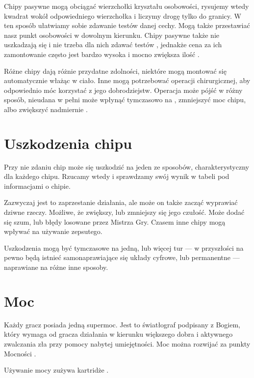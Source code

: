 Chipy pasywne mogą obciągać wierzchołki kryształu osobowości, rysujemy wtedy kwadrat wokół odpowiedniego wierzchołka i liczymy drogę tylko do granicy.
W ten sposób ułatwiamy sobie zdawanie testów danej cechy.
Mogą także przestawiać nasz punkt osobowości w dowolnym kierunku.
Chipy pasywne także nie uszkadzają się i nie trzeba dla nich zdawać testów \abnkp{}, jednakże cena za ich zamontowanie często jest bardzo wysoka i mocno zwiększa ilość \abnkp{}.

Różne chipy dają różnie przydatne zdolności, niektóre mogą montować się automatycznie włażąc w ciało.
Inne mogą potrzebować operacji chirurgicznej, aby odpowiednio móc korzystać z jego dobrodziejstw.
Operacja może pójść w różny sposób, nieudana w pełni może wpłynąć tymczasowo na \abzyc{}, zmniejszyć moc chipu, albo zwiększyć nadmiernie \abnkp{}.

\section{Uszkodzenia chipu}
Przy nie zdaniu \abnkp{} chip może się uszkodzić na jeden ze sposobów, charakterystyczny dla każdego chipu.
Rzucamy wtedy \dx{} i sprawdzamy swój wynik w tabeli pod informacjami o chipie.

Zazwyczaj jest to zaprzestanie działania, ale może on także zacząć wyprawiać dziwne rzeczy.
Możliwe, że zwiększy, lub zmniejszy się jego czułość.
Może dodać się szum, lub błędy losowane przez Mistrza Gry.
Czasem inne chipy mogą wpływać na używanie zepsutego.

Uszkodzenia mogą być tymczasowe na jedną, lub więcej tur --- w przyszłości na pewno będą istnieć samonaprawiające się układy cyfrowe, lub permanentne --- naprawiane na różne inne sposoby.

\section{Moc}
Każdy gracz posiada jedną supermoc.
Jest to światłograf podpisany z Bogiem, który wymaga od gracza działania w kierunku większego dobra i aktywnego zwalczania zła przy pomocy nabytej umiejętności.
Moc można rozwijać za punkty Mocności \xpmcn{}.

Używanie mocy zużywa kartridże \abkar{}.

